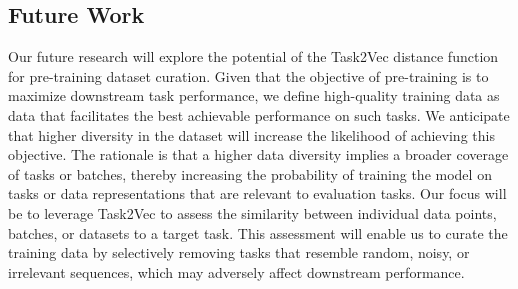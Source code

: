 \documentclass[10pt]{article} %
\begin{document}
\subsection{Future Work}
Our future research will explore the potential of the Task2Vec distance function for pre-training dataset curation. 
Given that the objective of pre-training is to maximize downstream task performance, we define high-quality training data as data that facilitates the best achievable performance on such tasks.
We anticipate that higher diversity in the dataset will increase the likelihood of achieving this objective.  
The rationale is that a higher data diversity implies a broader coverage of tasks or batches, thereby increasing the probability of training the model on tasks or data representations that are relevant to evaluation tasks.
Our focus will be to leverage Task2Vec to assess the similarity between individual data points, batches, or datasets to a target task. 
This assessment will enable us to curate the training data by selectively removing tasks that resemble random, noisy, or irrelevant sequences, which may adversely affect downstream performance.




\end{document}
